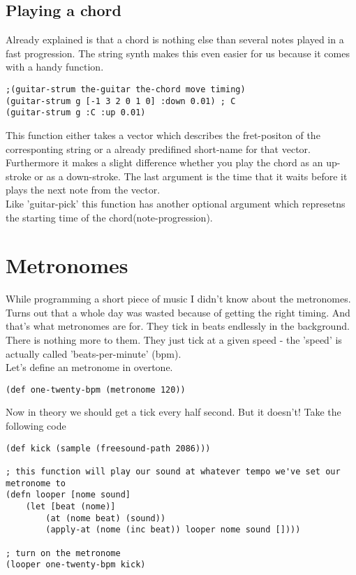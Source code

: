 \subsection{Playing a chord}
Already explained is that a chord is nothing else than several notes played in a fast progression. The string synth makes this even easier for us because it comes with a handy function.
\begin{lstlisting}
;(guitar-strum the-guitar the-chord move timing)
(guitar-strum g [-1 3 2 0 1 0] :down 0.01) ; C
(guitar-strum g :C :up 0.01)
\end{lstlisting} 
This function either takes a vector which describes the fret-positon of the corresponting string or a already predifined short-name for that vector. Furthermore it makes a slight difference whether you play the chord as an up-stroke or as a down-stroke. The last argument is the time that it waits before it plays the next note from the vector.\\ Like 'guitar-pick' this function has another optional argument which represetns the starting time of the chord(note-progression).

\section{Metronomes}
While programming a short piece of music I didn't know about the metronomes. Turns out that a whole day was wasted because of getting the right timing. And that's what metronomes are for. They tick in beats endlessly in the background. There is nothing more to them. They just tick at a given speed - the 'speed' is actually called 'beats-per-minute' (bpm).\\
Let's define an metronome in overtone.
\begin{lstlisting}
(def one-twenty-bpm (metronome 120))
\end{lstlisting}
Now in theory we should get a tick every half second. But it doesn't!
Take the following code
\begin{lstlisting}
(def kick (sample (freesound-path 2086)))

; this function will play our sound at whatever tempo we've set our metronome to 
(defn looper [nome sound]    
    (let [beat (nome)]
        (at (nome beat) (sound))
        (apply-at (nome (inc beat)) looper nome sound [])))

; turn on the metronome
(looper one-twenty-bpm kick)
\end{lstlisting}

